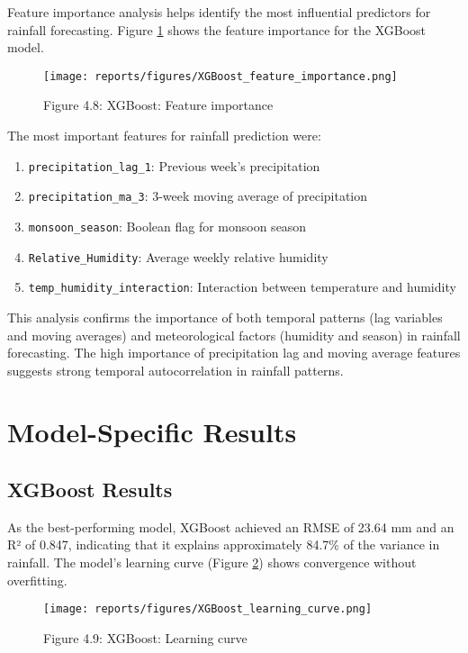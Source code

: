 \documentclass[12pt]{article}
\begin{document}
Feature importance analysis helps identify the most influential predictors for rainfall forecasting. Figure \ref{fig:chap4_fig8_xgb_feature_importance} shows the feature importance for the XGBoost model.

\begin{figure}[h]
\centering
\texttt{[image: reports/figures/XGBoost\_feature\_importance.png]}
\caption{Figure 4.8: XGBoost: Feature importance}
\label{fig:chap4_fig8_xgb_feature_importance}
\end{figure}

The most important features for rainfall prediction were:
\begin{enumerate}
    \item \texttt{precipitation\_lag\_1}: Previous week's precipitation
    \item \texttt{precipitation\_ma\_3}: 3-week moving average of precipitation
    \item \texttt{monsoon\_season}: Boolean flag for monsoon season
    \item \texttt{Relative\_Humidity}: Average weekly relative humidity
    \item \texttt{temp\_humidity\_interaction}: Interaction between temperature and humidity
\end{enumerate}

This analysis confirms the importance of both temporal patterns (lag variables and moving averages) and meteorological factors (humidity and season) in rainfall forecasting. The high importance of precipitation lag and moving average features suggests strong temporal autocorrelation in rainfall patterns.

\section{Model-Specific Results}
\label{sec:model_specific_results}

\subsection{XGBoost Results}
\label{subsec:xgboost_results}

As the best-performing model, XGBoost achieved an RMSE of 23.64 mm and an R² of 0.847, indicating that it explains approximately 84.7\% of the variance in rainfall. The model's learning curve (Figure \ref{fig:chap4_fig9_xgb_learning_curve}) shows convergence without overfitting.

\begin{figure}[h]
\centering
\texttt{[image: reports/figures/XGBoost\_learning\_curve.png]}
\caption{Figure 4.9: XGBoost: Learning curve}
\label{fig:chap4_fig9_xgb_learning_curve}
\end{figure}
\end{document}
